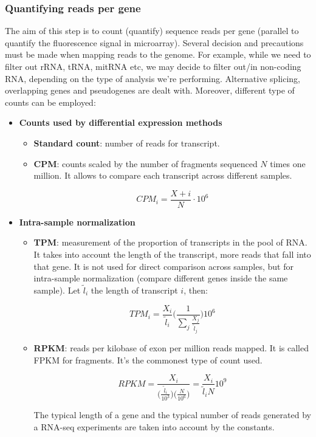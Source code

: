 		\subsubsection{Quantifying reads per gene}
		The aim of this step is to count (quantify) sequence reads per gene (parallel to quantify the fluorescence signal in microarray).
		Several decision and precautions must be made when mapping reads to the genome. For example, while we need to filter out rRNA, tRNA, mitRNA etc, we may decide to filter out/in non-coding RNA, depending on the type of analysis we're performing.
		Alternative splicing, overlapping genes and pseudogenes are dealt with.
		Moreover, different type of counts can be employed:
		
			\begin{itemize}
			\item \textbf{Counts used by differential expression methods}
				\begin{itemize}
								\item \textbf{Standard count}: number of reads for transcript.
				\item \textbf{CPM}: counts scaled by the number of fragments sequenced $N$ times one million.
					It allows to compare each transcript across different samples.

					$$CPM_i = \frac{X+i}{N}\cdot 10^6$$

				\end{itemize}
\item \textbf{Intra-sample normalization}
\begin{itemize}
				\item \textbf{TPM}: measurement of the proportion of transcripts in the pool of RNA.
					It takes into account the length of the transcript, more reads that fall into that gene.
					It is not used for direct comparison across samples, but for intra-sample normalization (compare different genes inside the same sample).
					Let $\tilde{l}_i$ the length of transcript $i$, then:

					$$TPM_i = \frac{X_i}{\tilde{l}_i}\biggl(\frac{1}{\sum\limits_j\frac{X_j}{\tilde{l}_j}}\biggr)10^6$$

				\item \textbf{RPKM}: reads per kilobase of exon per million reads mapped.
					It is called FPKM for fragments.
					It's the commonest type of count used.
					

					$$RPKM = \frac{X_i}{\big(\frac{\tilde{l}_i}{10^3}\big)\big(\frac{N}{10^6}\big)} = \frac{X_i}{\tilde{l}_iN}10^9$$
					
					The typical length of a gene and the typical number of reads generated by a RNA-seq experiments are taken into account by the constants.
\end{itemize}

			\end{itemize}
	
